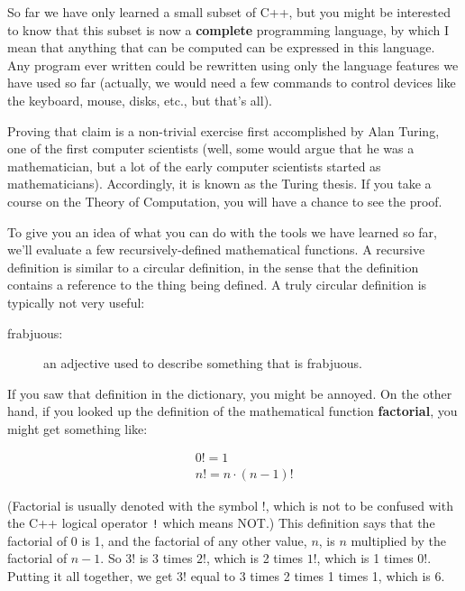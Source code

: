 So far we have only learned a small subset of C++, but you
might be interested to know that this subset is now
a {\bf complete} programming language, by which I
mean that anything that can be computed can be expressed in this
language.  Any program ever written could be rewritten
using only the language features we have used so far (actually, we
would need a few commands to control devices like the keyboard, mouse,
disks, etc., but that's all).


Proving that claim is a non-trivial exercise first
accomplished by Alan Turing, one of the first computer scientists
(well, some would argue that he was a mathematician, but a lot of the
early computer scientists started as mathematicians).  Accordingly, it
is known as the Turing thesis.  If you take a course on the Theory of
Computation, you will have a chance to see the proof.

To give you an idea of what you can do with the tools we have learned
so far, we'll evaluate a few recursively-defined
mathematical functions.  A recursive definition is similar to a
circular definition, in the sense that the definition contains a
reference to the thing being defined.  A truly circular definition is
typically not very useful:

\begin{description}

\item[frabjuous:] an adjective used to describe
something that is frabjuous.


\end{description}

If you saw that definition in the dictionary, you might be
annoyed.  On the other hand, if you looked up the definition
of the mathematical function {\bf factorial}, you might
get something like:

\begin{eqnarray*}
&&  0! = 1 \\
&&  n! = n \cdot (n-1)!
\end{eqnarray*}

(Factorial is usually denoted with the symbol $!$, which is
not to be confused with the C++ logical operator {\tt !} which
means NOT.)  This definition says that the factorial of 0 is 1,
and the factorial of any other value, $n$, is $n$ multiplied
by the factorial of $n-1$.  So $3!$ is 3 times $2!$, which is 2 times
$1!$, which is 1 times 0!.  Putting it all together, we get
$3!$ equal to 3 times 2 times 1 times 1, which is 6.

